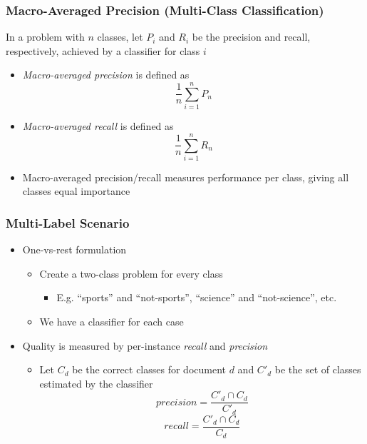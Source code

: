 \documentclass{beamer}
\begin{document}

\begin{frame} \frametitle{Macro-Averaged Precision (Multi-Class Classification)}
  
  In a problem with $n$ classes, let $P_i$ and $R_i$ be the precision and
  recall, respectively, achieved by a classifier for class $i$
  \begin{itemize}
  \item \emph{Macro-averaged precision} is defined as
    \begin{displaymath}
      \frac{1}{n}\sum_{i=1}^n P_n
    \end{displaymath}
  \item \emph{Macro-averaged recall} is defined as
    \begin{displaymath}
      \frac{1}{n}\sum_{i=1}^n R_n
    \end{displaymath}
  \end{itemize}
  \begin{itemize}
  \item Macro-averaged precision/recall measures performance per class, giving
    all classes equal importance
  \end{itemize}
\end{frame}


\begin{frame} \frametitle{Multi-Label Scenario }
  
  \begin{itemize}
  \item One-vs-rest formulation
    \begin{itemize}
    \item Create a two-class problem for every class
      \begin{itemize}
      \item E.g. ``sports'' and ``not-sports'', ``science'' and ``not-science'', etc.
      \end{itemize}
    \item We have a classifier for each case
    \end{itemize}
  \item Quality is measured by per-instance \emph{recall} and \emph{precision}
    \begin{itemize}
    \item Let $C_d$ be the correct classes for document $d$ and $C'_d$ be the
      set of classes estimated by the classifier
      \begin{displaymath}
        precision = \frac{C'_d \cap C_d}{C'_d}
      \end{displaymath}
      \begin{displaymath}
        recall = \frac{C'_d \cap C_d}{C_d}
      \end{displaymath}
    \end{itemize}
  \end{itemize}
\end{frame}
\end{document}
